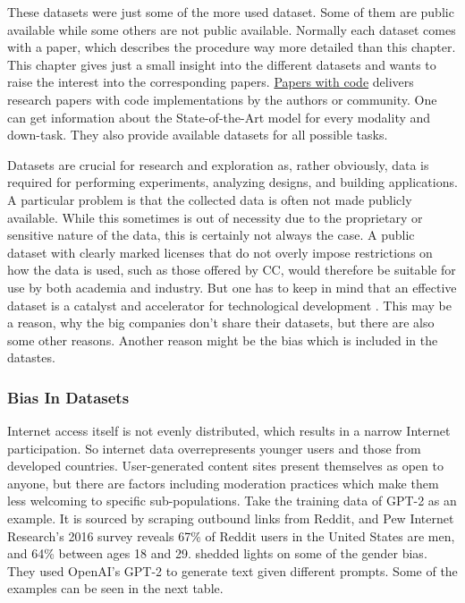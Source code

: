 \documentclass[
]{krantz}
\begin{document}
These datasets were just some of the more used dataset. Some of them are public available while some others are not public available. Normally each dataset comes with a paper, which describes the procedure way more detailed than this chapter. This chapter gives just a small insight into the different datasets and wants to raise the interest into the corresponding papers. \href{https://paperswithcode.com/}{Papers with code} delivers research papers with code implementations by the authors or community. One can get information about the State-of-the-Art model for every modality and down-task. They also provide available datasets for all possible tasks.

Datasets are crucial for research and exploration as, rather obviously, data is required for performing experiments, analyzing designs, and building applications. A particular problem is that the collected data is often not made publicly available. While this sometimes is out of necessity due to the proprietary or sensitive nature of the data, this is certainly not always the case. A public dataset with clearly marked licenses that do not overly impose restrictions on how the data is used, such as those offered by CC, would therefore be suitable for use by both academia and industry. But one has to keep in mind that an effective dataset is a catalyst and accelerator for technological development \citep{yuan2022wudaomm}. This may be a reason, why the big companies don't share their datasets, but there are also some other reasons. Another reason might be the bias which is included in the datastes.

\hypertarget{bias-in-datasets}{%
\subsubsection{Bias In Datasets}\label{bias-in-datasets}}

Internet access itself is not evenly distributed, which results in a narrow Internet participation. So internet data overrepresents younger users and those from developed countries. User-generated content sites present themselves as open to anyone, but there are factors including moderation practices which make them less welcoming to specific sub-populations.
Take the training data of GPT-2 as an example. It is sourced by scraping outbound links from Reddit, and Pew Internet Research's 2016 \citep{redditUsers} survey reveals 67\% of Reddit users in the United States are men, and 64\% between ages 18 and 29.
\citet{sheng2019woman} shedded lights on some of the gender bias. They used OpenAI's GPT-2 to generate text given different prompts. Some of the examples can be seen in the next table.
\end{document}

